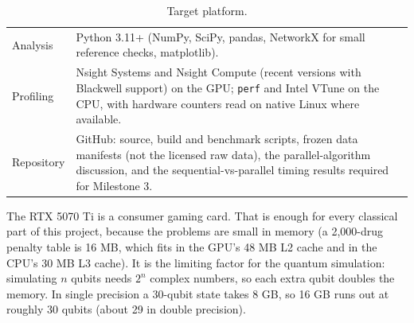 \begin{table}[ht]
\begin{tabularx}{\linewidth}{>{\raggedright\arraybackslash}p{3.2cm}X}
Analysis & Python 3.11+ (NumPy, SciPy, pandas, NetworkX for small reference checks, matplotlib). \\
Profiling & Nsight Systems and Nsight Compute (recent versions with Blackwell support) on the GPU; \texttt{perf} and Intel VTune on the CPU, with hardware counters read on native Linux where available. \\
Repository & GitHub: source, build and benchmark scripts, frozen data manifests (not the licensed raw data), the parallel-algorithm discussion, and the sequential-vs-parallel timing results required for Milestone 3. \\
\bottomrule
\end{tabularx}
\caption{Target platform.}
\label{tab:platform}
\end{table}

The RTX 5070 Ti is a consumer gaming card. That is enough for every classical part of this project, because the problems are small in memory (a 2{,}000-drug penalty table is 16 MB, which fits in the GPU's 48 MB L2 cache and in the CPU's 30 MB L3 cache). It is the limiting factor for the quantum simulation: simulating $n$ qubits needs $2^n$ complex numbers, so each extra qubit doubles the memory. In single precision a 30-qubit state takes 8 GB, so 16 GB runs out at roughly 30 qubits (about 29 in double precision).
